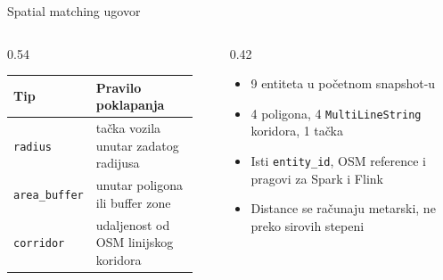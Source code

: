 \documentclass[aspectratio=169,11pt]{beamer}
\newcommand{\code}[1]{\texttt{\small #1}}
\newcommand{\tinycode}[1]{\texttt{\scriptsize #1}}
\begin{document}
\begin{frame}{Spatial matching ugovor}
  \begin{columns}[T,onlytextwidth]
    \begin{column}{0.54\textwidth}
      \begin{tabular}{@{}>{\raggedright\arraybackslash}p{0.27\linewidth}>{\raggedright\arraybackslash}p{0.64\linewidth}@{}}
        \toprule
        Tip & Pravilo poklapanja \\
        \midrule
        \tinycode{radius} & tačka vozila unutar zadatog radijusa \\
        \tinycode{area\_buffer} & unutar poligona ili buffer zone \\
        \tinycode{corridor} & udaljenost od OSM linijskog koridora \\
        \bottomrule
      \end{tabular}
    \end{column}
    \begin{column}{0.42\textwidth}
      \begin{itemize}
        \item 9 entiteta u početnom snapshot-u
        \item 4 poligona, 4 \code{MultiLineString} koridora, 1 tačka
        \item Isti \code{entity\_id}, OSM reference i pragovi za Spark i Flink
        \item Distance se računaju metarski, ne preko sirovih stepeni
      \end{itemize}
    \end{column}
  \end{columns}
\end{frame}
\end{document}
